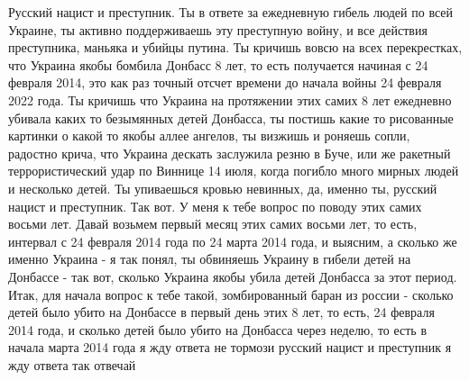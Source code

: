  
 
 
 
 

Русский нацист и преступник. Ты в ответе за ежедневную гибель людей по всей
Украине, ты активно поддерживаешь эту преступную войну, и все действия
преступника, маньяка и убийцы путина.  Ты кричишь вовсю на всех перекрестках,
что Украина якобы бомбила Донбасс 8 лет, то есть получается начиная с 24
февраля 2014, это как раз точный отсчет времени до начала войны 24 февраля 2022
года. Ты кричишь что Украина на протяжении этих самих 8 лет ежедневно убивала
каких то безымянных детей Донбасса, ты постишь какие то рисованные картинки о
какой то якобы аллее ангелов, ты визжишь и роняешь сопли, радостно крича, что
Украина дескать заслужила резню в Буче, или же ракетный террористический удар
по Виннице 14 июля, когда погибло много мирных людей и несколько детей. Ты
упиваешься кровью невинных, да, именно ты, русский нацист и преступник. Так
вот. У меня к тебе вопрос по поводу этих самих восьми лет.  Давай возьмем
первый месяц этих самих восьми лет, то есть, интервал с 24 февраля 2014 года по
24 марта 2014 года, и выясним, а сколько же именно Украина - я так понял, ты
обвиняешь Украину в гибели детей на Донбассе - так вот, сколько Украина якобы
убила детей Донбасса за этот период. Итак, для начала вопрос к тебе такой,
зомбированный баран из россии - сколько детей было убито на Донбассе в первый
день этих 8 лет, то есть, 24 февраля 2014 года, и сколько детей было убито на
Донбасса через неделю, то есть в начала марта 2014 года я жду ответа не тормози
русский нацист и преступник я жду ответа так отвечай
